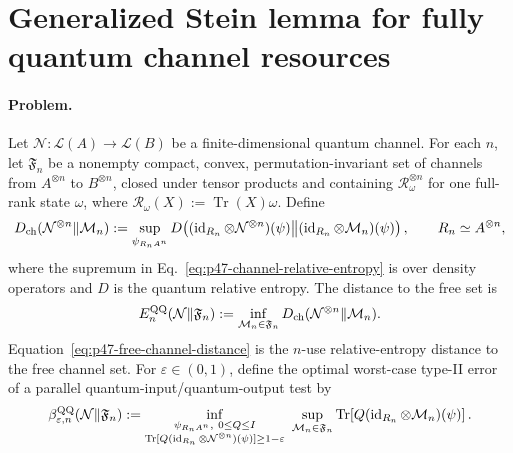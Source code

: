 \section{Generalized Stein lemma for fully quantum channel resources}
\label{sec:op_2579e084f37ac18c}

\paragraph{Problem.}
Let $\mathcal N:\mathcal L(A)\to\mathcal L(B)$ be a finite-dimensional
quantum channel.  For each $n$, let $\mathfrak F_n$ be a nonempty compact,
convex, permutation-invariant set of channels from $A^{\otimes n}$ to
$B^{\otimes n}$, closed under tensor products and containing
$\mathcal R_\omega^{\otimes n}$ for one full-rank state $\omega$, where
$\mathcal R_\omega(X):=\operatorname{Tr}(X)\omega$.  Define
\begin{equation}
  D_{\rm ch}(\mathcal N^{\otimes n}\|\mathcal M_n)
  :=\sup_{\psi_{R_nA^n}}
  D\!\left(
    (\operatorname{id}_{R_n}\otimes\mathcal N^{\otimes n})(\psi)
    \middle\|
    (\operatorname{id}_{R_n}\otimes\mathcal M_n)(\psi)
  \right),
  \qquad R_n\simeq A^{\otimes n},
  \label{eq:p47-channel-relative-entropy}
\end{equation}
where the supremum in Eq.~\eqref{eq:p47-channel-relative-entropy} is over
density operators and $D$ is the quantum relative entropy.  The distance to
the free set is
\begin{equation}
  E_n^{\rm QQ}(\mathcal N\|\mathfrak F_n)
  :=\inf_{\mathcal M_n\in\mathfrak F_n}
  D_{\rm ch}(\mathcal N^{\otimes n}\|\mathcal M_n).
  \label{eq:p47-free-channel-distance}
\end{equation}
Equation~\eqref{eq:p47-free-channel-distance} is the $n$-use relative-entropy
distance to the free channel set.  For $\varepsilon\in(0,1)$, define the
optimal worst-case type-II error of a
parallel quantum-input/quantum-output test by
\begin{equation}
  \begin{aligned}
  \beta_{\varepsilon,n}^{\rm QQ}(\mathcal N\|\mathfrak F_n)
  :=\inf_{\substack{\psi_{R_nA^n},\ 0\leq Q\leq I\\
       \operatorname{Tr}[Q(\operatorname{id}_{R_n}\otimes
       \mathcal N^{\otimes n})(\psi)]\geq1-\varepsilon}}
  \ \sup_{\mathcal M_n\in\mathfrak F_n}
  \operatorname{Tr}\!\left[
       Q(\operatorname{id}_{R_n}\otimes\mathcal M_n)(\psi)
  \right].
  \end{aligned}
  \label{eq:p47-composite-type-two-error}
\end{equation}
